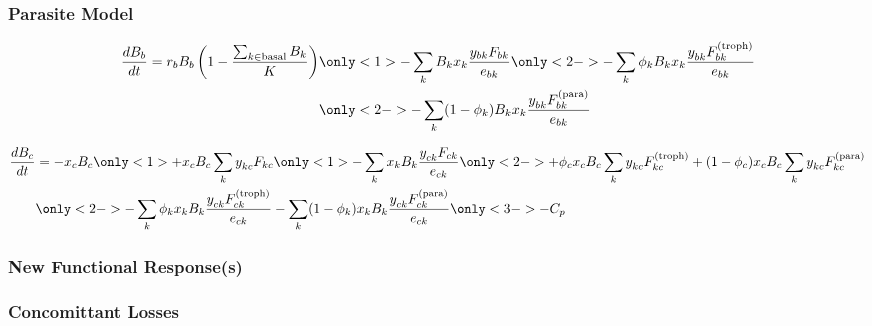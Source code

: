\documentclass[table]{beamer}
\begin{document}
\begin{frame}
    \frametitle{Parasite Model}
    \begin{align*}
        \frac{dB_{b}}{dt} =
        r_bB_b\left(1-\frac{\sum_{k\in\text{basal}}B_k}{K}\right) &\only<1>{-\sum_kB_kx_k\frac{y_{bk}F_{bk}}{e_{bk}}}
        \only<2->{-\sum_k\phi_kB_kx_k\frac{y_{bk}^{}F_{bk}^{\text{(troph)}}}{e_{bk}}}\\ 
        & \only<2->{-
    \sum_k(1-\phi_k)B_kx_k\frac{y_{bk}^{}F^{\text{(para)}}_{bk}}{e_{bk}}}
    \end{align*}
  
    \begin{align*}
        \frac{dB_{c}}{dt} &= -x_cB_c
        \only<1>{+ x_cB_c\sum_ky_{kc}^{ }F_{kc}}\only<1>{- \sum_k
    x_kB_k\frac{y_{ck}^{}F_{ck}}{e_{ck}}}
        \only<2->{+ \phi_cx_cB_c\sum_ky_{kc}^{ }F^{\text{(troph)}}_{kc} +
        (1-\phi_c)x_cB_c\sum_ky_{kc}^{ }F^{\text{(para)}}_{kc}}\\ 
        &    \only<2->{ - \sum_k \phi_kx_kB_k\frac{y_{ck}^{}F^{\text{(troph)}}_{ck}}{e_{ck}} -
        \sum_k (1-\phi_k)x_kB_k\frac{y_{ck}^{}F^{\text{(para)}}_{ck}}{e_{ck}}}
       \only<3->{-C_p}
    \end{align*}
\end{frame}

\begin{frame}
    \frametitle{New Functional Response(s)}
\end{frame}

\begin{frame}
    \frametitle{Concomittant Losses}
\end{frame}
\end{document}
